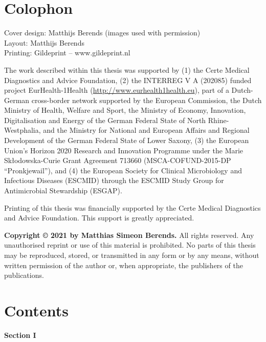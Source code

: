 \documentclass[
]{book}
\begin{document}
\hypertarget{colophon}{%
\chapter*{Colophon}\label{colophon}}

Cover design: Matthijs Berends (images used with permission)\\
Layout: Matthijs Berends\\
Printing: Gildeprint -- www.gildeprint.nl

The work described within this thesis was supported by (1) the Certe Medical Diagnostics and Advice Foundation, (2) the INTERREG V A (202085) funded project EurHealth-1Health (\url{http://www.eurhealth1health.eu}), part of a Dutch-German cross-border network supported by the European Commission, the Dutch Ministry of Health, Welfare and Sport, the Ministry of Economy, Innovation, Digitalisation and Energy of the German Federal State of North Rhine-Westphalia, and the Ministry for National and European Affairs and Regional Development of the German Federal State of Lower Saxony, (3) the European Union's Horizon 2020 Research and Innovation Programme under the Marie Skłodowska-Curie Grant Agreement 713660 (MSCA-COFUND-2015-DP ``Pronkjewail''), and (4) the European Society for Clinical Microbiology and Infectious Diseases (ESCMID) through the ESCMID Study Group for Antimicrobial Stewardship (ESGAP).

Printing of this thesis was financially supported by the Certe Medical Diagnostics and Advice Foundation. This support is greatly appreciated.

\textbf{Copyright © 2021 by Matthias Simeon Berends.} All rights reserved. Any unauthorised reprint or use of this material is prohibited. No parts of this thesis may be reproduced, stored, or transmitted in any form or by any means, without written permission of the author or, when appropriate, the publishers of the publications.

\hypertarget{contents}{%
\chapter*{Contents}\label{contents}}

\textbf{Section I}
\end{document}
